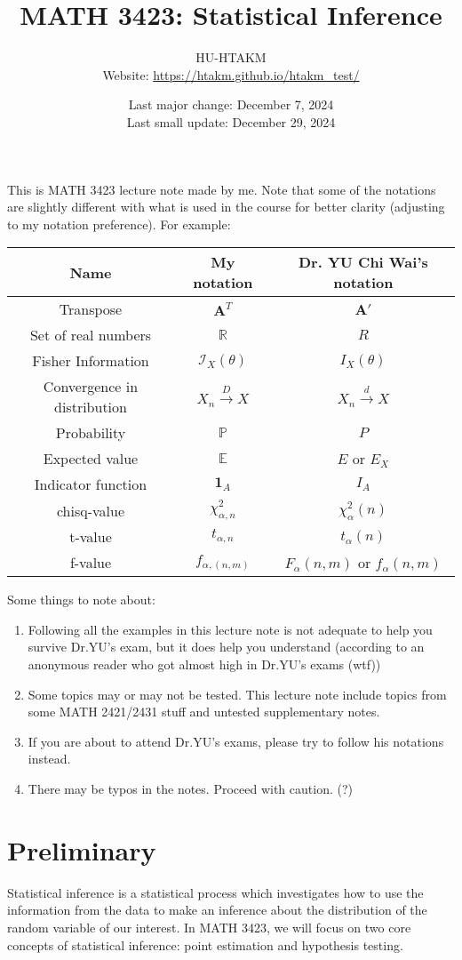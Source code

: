 \documentclass{huhtakm-template-book-v2}
\title{
	\Huge MATH 3423: Statistical Inference
}
\author{
	HU-HTAKM\\
	\small Website: \url{https://htakm.github.io/htakm_test/}
}
\date{
	Last major change: December 7, 2024\\
	Last small update: December 29, 2024
}
\DeclareMathOperator{\prob}{\mathbb{P}}
\DeclareMathOperator{\E}{\mathbb{E}}
\begin{document}
\maketitle
This is MATH 3423 lecture note made by me. Note that some of the notations are slightly different with what is used in the course for better clarity (adjusting to my notation preference). For example:
\begin{table}[h]
	\centering
	\begin{tabular}{||c|c|c||}
		\hline
		Name & My notation & Dr. YU Chi Wai's notation\\
		\hline
		Transpose & $\mathbf{A}^{T}$ &  $\mathbf{A}'$\\
		Set of real numbers & $\mathbb{R}$ & $R$\\
		Fisher Information & $\mathcal{I}_{X}(\theta)$ & $I_{X}(\theta)$\\
		Convergence in distribution & $X_{n}\xrightarrow{D}X$ & $X_{n}\xrightarrow{d}X$\\
		Probability & $\prob$ & $P$\\
		Expected value & $\E$ & $E$ or $E_{X}$\\
		Indicator function & $\mathbf{1}_{A}$ & $I_{A}$\\
		chisq-value & $\chi_{\alpha,n}^{2}$ & $\chi_{\alpha}^{2}(n)$\\
		t-value & $t_{\alpha,n}$ & $t_{\alpha}(n)$\\
		f-value & $f_{\alpha,(n,m)}$ & $F_{\alpha}(n,m)$ or $f_{\alpha}(n,m)$\\
		\hline
	\end{tabular}
\end{table}

Some things to note about:
\begin{enumerate}
	\item Following all the examples in this lecture note is not adequate to help you survive Dr.YU's exam, but it does help you understand (according to an anonymous reader who got almost high in Dr.YU's exams (wtf))
	\item Some topics may or may not be tested. This lecture note include topics from some MATH 2421/2431 stuff and untested supplementary notes.
	\item If you are about to attend Dr.YU's exams, please try to follow his notations instead.
	\item There may be typos in the notes. Proceed with caution. (?)
\end{enumerate}
\tableofcontents
\chapter{Preliminary}
Statistical inference is a statistical process which investigates how to use the information from the data to make an inference about the distribution of the random variable of our interest. In MATH 3423, we will focus on two core concepts of statistical inference: point estimation and hypothesis testing.
\end{document}
